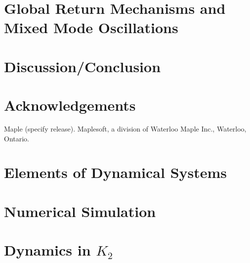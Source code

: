 \documentclass{article}
\begin{document}
\section{Global Return Mechanisms and Mixed Mode Oscillations}\label{sec:MMO}


\section{Discussion/Conclusion}

\section{Acknowledgements}
Maple (specify release). Maplesoft, a division of Waterloo Maple Inc., Waterloo, Ontario.
\newpage


\nocite{strogatz2007nonlinear}

\newpage
\appendix
\section{Elements of Dynamical Systems}\label{app:DynSys}

%
%
\section{Numerical Simulation}\label{app:NumSim}

\section{Dynamics in \texorpdfstring{$K_2$}{K2}}
\end{document}
